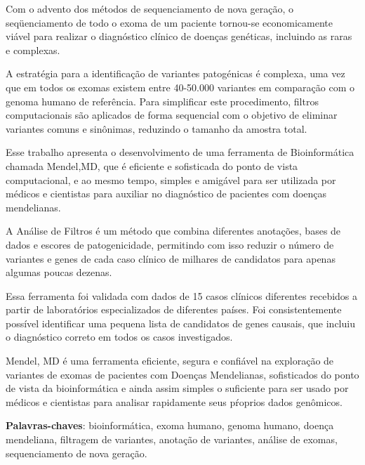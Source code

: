 \documentclass[
	12pt,				%
	openany,			%
	oneside,			%
	a4paper,			%
	english,			%
	brazil,				%
	]{abntex2}
\begin{document}


\begin{resumo}

Com o advento dos métodos de sequenciamento de nova geração, o seqüenciamento de todo o exoma de um paciente tornou-se economicamente viável para realizar o diagnóstico clínico de doenças genéticas, incluindo as raras e complexas. 

A estratégia para a identificação de variantes patogénicas é complexa, uma vez que em todos os exomas existem entre 40-50.000 variantes em comparação com o genoma humano de referência. Para simplificar este procedimento, filtros computacionais são aplicados de forma sequencial com o objetivo de eliminar variantes comuns e sinônimas, reduzindo o tamanho da amostra total. 

Esse trabalho apresenta o desenvolvimento de uma ferramenta de Bioinformática chamada Mendel,MD, que é eficiente e sofisticada do ponto de vista computacional, e ao mesmo tempo, simples e amigável para ser utilizada por médicos e cientistas para auxiliar no diagnóstico de pacientes com doenças mendelianas.

A Análise de Filtros é um método que combina diferentes anotações, bases de dados e escores de patogenicidade, permitindo com isso reduzir o número de variantes e genes de cada caso clínico de milhares de candidatos para apenas algumas poucas dezenas.

Essa ferramenta foi validada com dados de 15 casos clínicos diferentes recebidos a partir de laboratórios especializados de diferentes países. Foi consistentemente possível identificar uma pequena lista de candidatos de genes causais, que incluiu o diagnóstico correto em todos os casos investigados.

Mendel, MD é uma ferramenta eficiente, segura e confiável na exploração de variantes de exomas de pacientes com Doenças Mendelianas, sofisticados do ponto de vista da bioinformática e ainda assim simples o suficiente para ser usado por médicos e cientistas para analisar rapidamente seus pŕoprios dados genômicos.

 \vspace{\onelineskip}
 \noindent
 \textbf{Palavras-chaves}: bioinformática, exoma humano, genoma humano, doença mendeliana, filtragem de variantes, anotação de variantes, análise de exomas, sequenciamento de nova geração.
\end{resumo}
\end{document}
